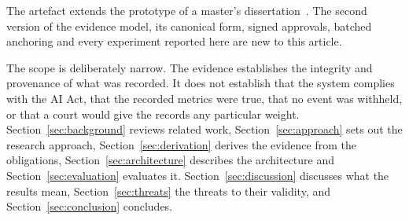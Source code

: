 The artefact extends the prototype of a master's dissertation~\cite{sousa2026}. The second version of the evidence model, its canonical form, signed approvals, batched anchoring and every experiment reported here are new to this article.

The scope is deliberately narrow. The evidence establishes the integrity and provenance of what was recorded. It does not establish that the system complies with the AI Act, that the recorded metrics were true, that no event was withheld, or that a court would give the records any particular weight. Section~\ref{sec:background} reviews related work, Section~\ref{sec:approach} sets out the research approach, Section~\ref{sec:derivation} derives the evidence from the obligations, Section~\ref{sec:architecture} describes the architecture and Section~\ref{sec:evaluation} evaluates it. Section~\ref{sec:discussion} discusses what the results mean, Section~\ref{sec:threats} the threats to their validity, and Section~\ref{sec:conclusion} concludes.
